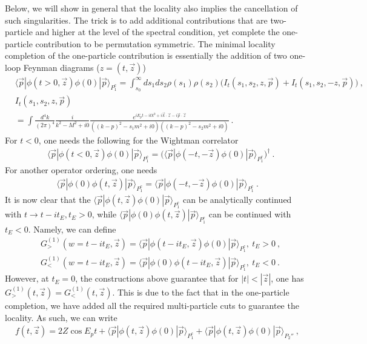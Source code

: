 \documentclass[a4paper,11pt]{article}
\begin{document}
Below, we will show in general that the locality also implies the cancellation of such singularities. The trick is to add additional contributions that are two-particle and higher at the level of the spectral condition, yet complete the one-particle contribution to be permutation symmetric. The minimal locality completion of the one-particle contribution is essentially the addition of two one-loop Feynman diagrams ($z=(t,\vec{z})$)
\begin{align}
&\langle\vec{p}|\phi(t>0,\vec{z})\phi(0)|\vec{p}\rangle\nonumber_{P_1^c}=\int_{s_0}^{\infty}ds_1ds_2 \rho(s_1)\rho(s_2) \bigg(I_{t}(s_1,s_2,z,\vec{p})+I_t(s_1,s_2,-z,\vec{p})\bigg) \ , \\
&I_t(s_1,s_2,z,\vec{p})\nonumber \\ 
&=\int\frac{d^4k}{(2\pi)^4}\frac{i}{k^2-M^2+i0}\frac{e^{iE_pt-itk^0+i\vec{k}\cdot \vec{z}-i\vec{p}\cdot \vec{z}}}{((k-p)^2-s_1m^2+i0)((k-p)^2-s_2m^2+i0)} \ . 
\end{align}
For $t<0$, one needs the following for the Wightman correlator
\begin{align}
&\langle\vec{p}|\phi(t<0,\vec{z})\phi(0)|\vec{p}\rangle\nonumber_{P_1^c}=\bigg(\langle\vec{p}|\phi(-t,-\vec{z})\phi(0)|\vec{p}\rangle\nonumber_{P_1^c}\bigg)^{\dagger} \ . 
\end{align}
For another operator ordering, one needs
\begin{align}
\langle\vec{p}|\phi(0)\phi(t,\vec{z})|\vec{p}\rangle\nonumber_{P_1^c}=\langle\vec{p}|\phi(-t,-\vec{z})\phi(0)|\vec{p}\rangle\nonumber_{P_1^c} \ . 
\end{align}
It is now clear that the $\langle \vec{p}|\phi(t,\vec{z})\phi(0)| \vec{p}\rangle_{P_1^c}$ can be analytically continued with $t\rightarrow t-it_E, t_E>0$, while $\langle \vec{p}|\phi(0)\phi(t,\vec{z})| \vec{p}\rangle_{P_1^c}$ can be continued with $t_E<0$. Namely, we can define
\begin{align}
&G_>^{(1)}(w=t-it_E,\vec{z})=\langle \vec{p}|\phi(t-it_E,\vec{z})\phi(0)|\vec{p} \rangle_{P_1^c}, \ t_E>0 \ , \\
&G_<^{(1)}(w=t-it_E,\vec{z})=\langle \vec{p}|\phi(0)\phi(t-it_E,\vec{z})|\vec{p} \rangle_{P_1^c}, \   t_E<0 \ . 
\end{align}
However, at $t_E=0$, the constructions above guarantee that for $|t|<|\vec{z}|$, one has $G_>^{(1)}(t,\vec{z})=G_<^{(1)}(t, \vec{z})$. This is due to the fact that in the one-particle completion, we have added all the required multi-particle cuts to guarantee the locality. As such, we can write
\begin{align}
f(t,\vec{z})=2Z\cos E_pt+\langle \vec{p}|\phi(t,\vec{z})\phi(0)|\vec{p}\rangle_{P_1^c}+\langle \vec{p}|\phi(t,\vec{z})\phi(0)|\vec{p}\rangle_{P_2''} \ , 
\end{align}
\end{document}
